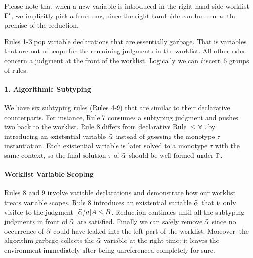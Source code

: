 
Please note that when a new variable is introduced in the right-hand side worklist $\Gamma'$,
we implicitly pick a fresh one,
since the right-hand side can be seen as the premise of the reduction.

Rules 1-3 pop variable declarations that are essentially garbage.
That is variables that are
out of scope for the remaining judgments in the worklist.
All other rules concern a judgment at the front of the worklist. Logically we
can discern 6 groups of rules.

\paragraph{{\bf 1. Algorithmic Subtyping}}
We have six subtyping rules (Rules 4-9) that are similar to their
declarative counterparts. For instance, Rule 7 consumes a subtyping
judgment and pushes two back to the worklist.  Rule 8 differs from
declarative Rule $\mathtt{{\le}{\forall}L}$ by introducing an existential
variable $\al$ instead of guessing the monotype $\tau$
instantiation. Each existential variable is later solved to a
monotype $\tau$ with the same context, so the final solution $\tau$ of
$\al$ should be well-formed under $\Gamma$.

\paragraph{Worklist Variable Scoping}
Rules 8 and 9 involve variable declarations and demonstrate how our
worklist treats variable scopes. Rule 8 introduces an existential
variable $\al$ that is only visible to the judgment $[\al/a]A \le B$.
Reduction continues until all the subtyping judgments in front of $\al$
are satisfied.  Finally we can safely remove $\al$ since no occurrence
of $\al$ could have leaked into the left part of the worklist.  Moreover,
the algorithm garbage-collects the $\al$
variable at the right time: it leaves the environment immediately
after being unreferenced completely for sure.

